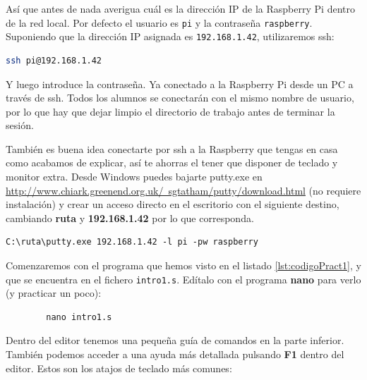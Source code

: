Así que antes de nada averigua cuál es la dirección IP de la Raspberry
Pi dentro de la red local. Por defecto el usuario es {\tt pi} y la
contraseña {\tt raspberry}. Suponiendo que la dirección IP asignada es
{\tt 192.168.1.42}, utilizaremos ssh:

\begin{lstlisting}[language=bash]
        ssh pi@192.168.1.42
\end{lstlisting}

Y luego introduce la contraseña. Ya conectado a la Raspberry Pi desde un PC
a través de ssh. Todos los alumnos se conectarán con el mismo nombre de usuario,
por lo que hay que dejar limpio el directorio de trabajo antes de terminar
la sesión.

También es buena idea conectarte por ssh a la Raspberry que tengas en casa
como acabamos de explicar, así te ahorras el tener que disponer de teclado
y monitor extra. Desde Windows puedes bajarte putty.exe 
en \newline
\textcolor{blue}{
  \href{http://www.chiark.greenend.org.uk/~sgtatham/putty/download.html}
  {http://www.chiark.greenend.org.uk/~sgtatham/putty/download.html}}
(no requiere instalación) y crear un acceso directo en el escritorio con
el siguiente destino, cambiando {\bf ruta} y {\bf 192.168.1.42} por lo que
corresponda.

\begin{lstlisting}
C:\ruta\putty.exe 192.168.1.42 -l pi -pw raspberry
\end{lstlisting}

Comenzaremos con el programa que hemos visto en el listado
\ref{lst:codigoPract1}, y que se encuentra en el fichero {\tt intro1.s}.
Edítalo con el programa {\bf nano} para verlo (y practicar un poco):

\begin{lstlisting}
        nano intro1.s
\end{lstlisting}

Dentro del editor tenemos una pequeña guía de comandos en la parte
inferior. También podemos acceder a una ayuda más detallada pulsando {\bf F1}
dentro del editor. Estos son los atajos de teclado más comunes:

